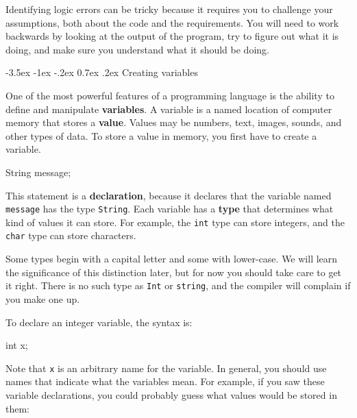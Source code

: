 \documentclass[12pt]{book}
\makeatletter
\renewcommand{\section}{\@startsection {section}{1}{\z@}%
    {-3.5ex \@plus -1ex \@minus -.2ex}%
    {0.7ex \@plus.2ex}%
    {\normalfont\Large\bfseries}}
\theoremstyle{exercise}
\newcommand{\java}[1]{\lstinline{#1}} %
\makeatother
\begin{document}
Identifying logic errors can be tricky because it requires you to challenge your assumptions, both about the code and the requirements.
You will need to work backwards by looking at the output of the program, try to figure out what it is doing, and make sure you understand what it should be doing.


\section{Creating variables}


One of the most powerful features of a programming language is the ability to define and manipulate {\bf variables}.
A variable is a named location of computer memory that stores a {\bf value}.
Values may be numbers, text, images, sounds, and other types of data.
To store a value in memory, you first have to create a variable.

\begin{code}
    String message;
\end{code}


This statement is a {\bf declaration}, because it declares that the variable named \java{message} has the type \java{String}.
Each variable has a {\bf type} that determines what kind of values it can store.
For example, the \java{int} type can store integers, and the \java{char} type can store characters.

Some types begin with a capital letter and some with lower-case.
We will learn the significance of this distinction later, but for now you should take care to get it right.
There is no such type as \java{Int} or \java{string}, and the compiler will complain if you make one up.

To declare an integer variable, the syntax is:

\begin{code}
    int x;
\end{code}

Note that \java{x} is an arbitrary name for the variable.
In general, you should use names that indicate what the variables mean.
For example, if you saw these variable declarations, you could probably guess what values would be stored in them:
\end{document}
